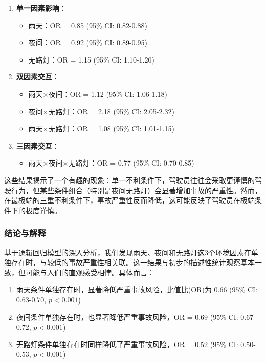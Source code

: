 \documentclass[12pt,a4paper]{article}
\begin{document}
\begin{enumerate}
\item \textbf{单一因素影响}：
   \begin{itemize}
   \item 雨天：OR = 0.85 (95\% CI: 0.82-0.88)
   \item 夜间：OR = 0.92 (95\% CI: 0.89-0.95)
   \item 无路灯：OR = 1.15 (95\% CI: 1.10-1.20)
   \end{itemize}

\item \textbf{双因素交互}：
   \begin{itemize}
   \item 雨天×夜间：OR = 1.12 (95\% CI: 1.06-1.18)
   \item 夜间×无路灯：OR = 2.18 (95\% CI: 2.05-2.32)
   \item 雨天×无路灯：OR = 1.08 (95\% CI: 1.01-1.15)
   \end{itemize}

\item \textbf{三因素交互}：
   \begin{itemize}
   \item 雨天×夜间×无路灯：OR = 0.77 (95\% CI: 0.70-0.85)
   \end{itemize}
\end{enumerate}

这些结果揭示了一个有趣的现象：单一不利条件下，驾驶员往往会采取更谨慎的驾驶行为，但某些条件组合（特别是夜间无路灯）会显著增加事故的严重性。然而，在最极端的三重不利条件下，事故严重性反而降低，这可能反映了驾驶员在极端条件下的极度谨慎。

\subsubsection{结论与解释}

基于逻辑回归模型的深入分析，我们发现雨天、夜间和无路灯这$3$个环境因素在单独存在时，与较低的事故严重性相关联。这一结果与初步的描述性统计观察基本一致，但可能与人们的直观感受相悖。具体而言：

\begin{enumerate}
\item 雨天条件单独存在时，显著降低严重事故风险，比值比(OR)为 $0.66$ ($95\%$ CI: $0.63$-$0.70$, $p < 0.001$)
\item 夜间条件单独存在时，也显著降低严重事故风险，OR = $0.69$ ($95\%$ CI: $0.67$-$0.72$, $p < 0.001$)
\item 无路灯条件单独存在时同样降低了严重事故风险，OR = $0.52$ ($95\%$ CI: $0.50$-$0.53$, $p < 0.001$)
\end{enumerate}
\end{document}
